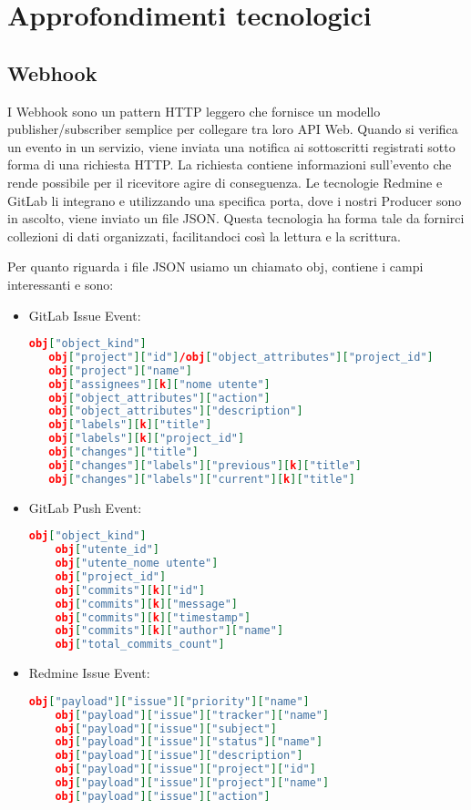 \newpage
\section{Approfondimenti tecnologici}\label{ApprofondimentiTecnologici}
	
	\subsection{Webhook}
		I Webhook sono un pattern HTTP leggero che fornisce un modello publisher/subscriber semplice
		per collegare tra loro API Web.	
		Quando si verifica un evento in un servizio, viene inviata una
		notifica ai sottoscritti registrati sotto forma di una richiesta HTTP. La richiesta contiene informazioni sull'evento che rende possibile per il ricevitore agire di conseguenza.
		Le tecnologie Redmine e GitLab li integrano e utilizzando una specifica porta, dove i nostri
		Producer sono in ascolto, viene inviato un file JSON. Questa tecnologia ha forma tale da fornirci collezioni di dati organizzati, facilitandoci così la lettura e la scrittura.\par
        Per quanto riguarda i file JSON usiamo un  chiamato obj, contiene i campi interessanti e sono:
            \begin{itemize}
                \item GitLab Issue Event:
\begin{lstlisting}[language = json]
   obj["object_kind"]
   obj["project"]["id"]/obj["object_attributes"]["project_id"]
   obj["project"]["name"]
   obj["assignees"][k]["nome utente"]
   obj["object_attributes"]["action"]
   obj["object_attributes"]["description"]
   obj["labels"][k]["title"]
   obj["labels"][k]["project_id"]
   obj["changes"]["title"]
   obj["changes"]["labels"]["previous"][k]["title"]
   obj["changes"]["labels"]["current"][k]["title"]
\end{lstlisting}
                \item GitLab Push Event:
\begin{lstlisting}[language = json]
    obj["object_kind"]
    obj["utente_id"]
    obj["utente_nome utente"]
    obj["project_id"]
    obj["commits"][k]["id"]
    obj["commits"][k]["message"]
    obj["commits"][k]["timestamp"]
    obj["commits"][k]["author"]["name"]
    obj["total_commits_count"]
\end{lstlisting}
                \item Redmine Issue Event:
\begin{lstlisting}[language = json]
    obj["payload"]["issue"]["priority"]["name"]
    obj["payload"]["issue"]["tracker"]["name"]
    obj["payload"]["issue"]["subject"]
    obj["payload"]["issue"]["status"]["name"]
    obj["payload"]["issue"]["description"]
    obj["payload"]["issue"]["project"]["id"]
    obj["payload"]["issue"]["project"]["name"]
    obj["payload"]["issue"]["action"]
\end{lstlisting}
            \end{itemize}
	
